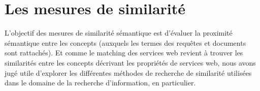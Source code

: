 \chapter{Les mesures de similarité}
\label{annexe:similarity-measurement}

L'objectif des mesures de similarité sémantique est d'évaluer la
proximité sémantique entre les concepts (auxquels les termes des
requêtes et documents sont rattachés). Et comme le matching des
services web revient à trouver les similarités entre les concepts
décrivant les propriétés de services web, nous avons jugé utile
d'explorer les différentes méthodes de recherche de similarité
utilisées dans le domaine de la recherche d’information, en
particulier.







